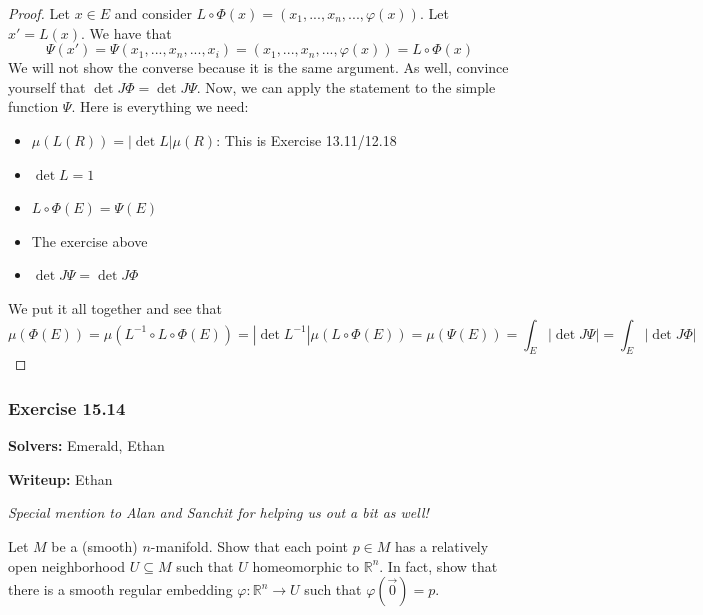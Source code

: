 \documentclass{article}
\theoremstyle{plain} %
\numberwithin{thm}{section} %
\theoremstyle{definition}
\begin{document}
\begin{proof}
        Let \(x \in E\) and consider \(L \circ \Phi (x) = (x_1, ..., x_n, ..., \varphi (x))\). Let \(x' = L(x)\). We have that
        \[
            \Psi (x') = \Psi (x_1, ..., x_n, ..., x_i) = (x_1, ..., x_n, ..., \varphi (x)) = L \circ \Phi (x)
        \]
        We will not show the converse because it is the same argument. As well, convince yourself that \(\det J \Phi = \det J \Psi\). Now, we can apply the statement to the simple function \(\Psi\). Here is everything we need:
        \begin{itemize}
            \item \(\mu (L(R)) = |\det L| \mu (R)\): This is Exercise 13.11/12.18
            \item \(\det L = 1\)
            \item \(L \circ \Phi (E) = \Psi (E)\)
            \item The exercise above
            \item \(\det J \Psi = \det J \Phi\) 
        \end{itemize}
        We put it all together and see that
        \[
            \mu (\Phi (E)) = \mu (L^{-1} \circ L \circ \Phi (E)) = |\det L^{-1}| \mu (L \circ \Phi (E)) = \mu (\Psi (E)) = \int _E |\det J \Psi | = \int _E |\det J \Phi |
        \]
    \end{proof}
    \subsubsection{Exercise 15.14}
    \textbf{Solvers:} Emerald, Ethan

    \textbf{Writeup:} Ethan

    \begin{center}
        \textit{Special mention to Alan and Sanchit for helping us out a bit as well!}
    \end{center}
    Let \(M\) be a (smooth) \(n\)-manifold. Show that each point \(p \in M\) has a relatively open neighborhood \(U \subseteq M\) such that \(U\) homeomorphic to \(\mathbb{R}^n\). In fact, show that there is a smooth regular embedding \(\varphi : \mathbb{R}^n \to U\) such that \(\varphi (\vec{0}) = p\).
\end{document}
